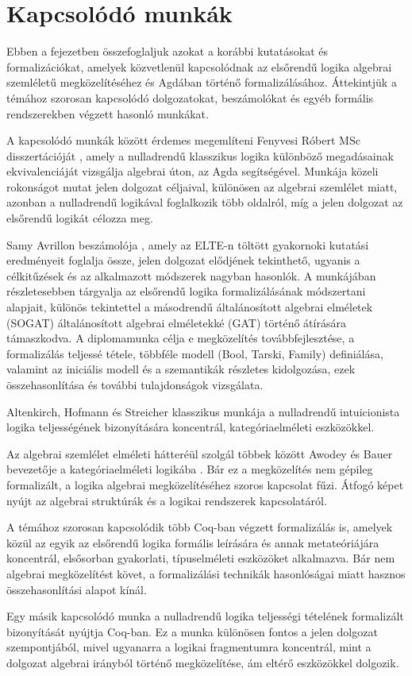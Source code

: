 \chapter{Kapcsolódó munkák}
\label{ch:related_work}

Ebben a fejezetben összefoglaljuk azokat a korábbi kutatásokat és formalizációkat, amelyek közvetlenül kapcsolódnak az elsőrendű logika algebrai szemléletű megközelítéséhez és Agdában történő formalizálásához. Áttekintjük a témához szorosan kapcsolódó dolgozatokat, beszámolókat és egyéb formális rendszerekben végzett hasonló munkákat.

A kapcsolódó munkák között érdemes megemlíteni Fenyvesi Róbert MSc disszertációját \cite{fenyvesi2022}, amely a nulladrendű klasszikus logika különböző megadásainak ekvivalenciáját vizsgálja algebrai úton, az Agda segítségével. Munkája közeli rokonságot mutat jelen dolgozat céljaival, különösen az algebrai szemlélet miatt, azonban a nulladrendű logikával foglalkozik több oldalról, míg a jelen dolgozat az elsőrendű logikát célozza meg.

Samy Avrillon beszámolója \cite{avrillon2023}, amely az ELTE-n töltött gyakornoki kutatási eredményeit foglalja össze, jelen dolgozat elődjének tekinthető, ugyanis a célkitűzések és az alkalmazott módszerek nagyban hasonlók. A munkájában részletesebben tárgyalja az elsőrendű logika formalizálásának módszertani alapjait, különös tekintettel a másodrendű általánosított algebrai elméletek (SOGAT) általánosított algebrai elméletekké (GAT) történő átírására támaszkodva. A diplomamunka célja e megközelítés továbbfejlesztése, a formalizálás teljessé tétele, többféle modell (Bool, Tarski, Family) definiálása, valamint az iniciális modell és a szemantikák részletes kidolgozása, ezek összehasonlítása és további tulajdonságok vizsgálata.

Altenkirch, Hofmann és Streicher klasszikus munkája \cite{altenkirch1995} a nulladrendű intuicionista logika teljességének bizonyítására koncentrál, kategóriaelméleti eszközökkel.

Az algebrai szemlélet elméleti hátteréül szolgál többek között Awodey és Bauer bevezetője a kategóriaelméleti logikába \cite{awodeybauer2020}. Bár ez a megközelítés nem gépileg formalizált, a logika algebrai megközelítéséhez szoros kapcsolat fűzi. Átfogó képet nyújt az algebrai struktúrák és a logikai rendszerek kapcsolatáról.

A témához szorosan kapcsolódik több Coq-ban végzett formalizálás is, amelyek közül az egyik \cite{coq1st} az elsőrendű logika formális leírására és annak metateóriájára koncentrál, elsősorban gyakorlati, típuselméleti eszközöket alkalmazva. Bár nem algebrai megközelítést követ, a formalizálási technikák hasonlóságai miatt hasznos összehasonlítási alapot kínál.

Egy másik kapcsolódó munka \cite{coq0th} a nulladrendű logika teljességi tételének formalizált bizonyítását nyújtja Coq-ban. Ez a munka különösen fontos a jelen dolgozat szempontjából, mivel ugyanarra a logikai fragmentumra koncentrál, mint a dolgozat algebrai irányból történő megközelítése, ám eltérő eszközökkel dolgozik.